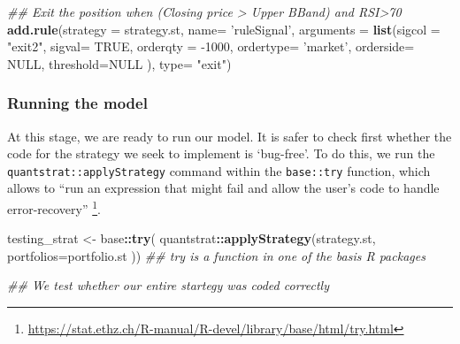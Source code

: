 \documentclass[
  11pt,
]{article}
\newenvironment{Shaded}{\begin{snugshade}}{\end{snugshade}}
\newcommand{\CommentTok}[1]{\textcolor[rgb]{0.56,0.35,0.01}{\textit{#1}}}
\newcommand{\DataTypeTok}[1]{\textcolor[rgb]{0.13,0.29,0.53}{#1}}
\newcommand{\DecValTok}[1]{\textcolor[rgb]{0.00,0.00,0.81}{#1}}
\newcommand{\KeywordTok}[1]{\textcolor[rgb]{0.13,0.29,0.53}{\textbf{#1}}}
\newcommand{\NormalTok}[1]{#1}
\newcommand{\OperatorTok}[1]{\textcolor[rgb]{0.81,0.36,0.00}{\textbf{#1}}}
\newcommand{\OtherTok}[1]{\textcolor[rgb]{0.56,0.35,0.01}{#1}}
\newcommand{\StringTok}[1]{\textcolor[rgb]{0.31,0.60,0.02}{#1}}
\begin{document}
\begin{Shaded}
\begin{Highlighting}[]
\CommentTok{## Exit the position when (Closing price > Upper BBand) and RSI>70  }
\KeywordTok{add.rule}\NormalTok{(}\DataTypeTok{strategy =}\NormalTok{ strategy.st, }\DataTypeTok{name=} \StringTok{'ruleSignal'}\NormalTok{,}
         \DataTypeTok{arguments =} \KeywordTok{list}\NormalTok{(}\DataTypeTok{sigcol =} \StringTok{"exit2"}\NormalTok{, }\DataTypeTok{sigval=} \OtherTok{TRUE}\NormalTok{,}
                          \DataTypeTok{orderqty =} \DecValTok{-1000}\NormalTok{, }\DataTypeTok{ordertype=} \StringTok{'market'}\NormalTok{, }\DataTypeTok{orderside=} \OtherTok{NULL}\NormalTok{,}
                          \DataTypeTok{threshold=}\OtherTok{NULL}\NormalTok{ ),  }
         \DataTypeTok{type=} \StringTok{"exit"}\NormalTok{)}
\end{Highlighting}
\end{Shaded}

\hypertarget{running-the-model}{%
\subsubsection{Running the model}\label{running-the-model}}

At this stage, we are ready to run our model. It is safer to check first
whether the code for the strategy we seek to implement is `bug-free'. To
do this, we run the \texttt{quantstrat::applyStrategy} command within
the \texttt{base::try} function, which allows to ``run an expression
that might fail and allow the user's code to handle error-recovery''
\footnote{\url{https://stat.ethz.ch/R-manual/R-devel/library/base/html/try.html}}.

\begin{Shaded}
\begin{Highlighting}[]
\NormalTok{testing_strat <-}\StringTok{ }\NormalTok{base}\OperatorTok{::}\KeywordTok{try}\NormalTok{( quantstrat}\OperatorTok{::}\KeywordTok{applyStrategy}\NormalTok{(strategy.st,}
                        \DataTypeTok{portfolios=}\NormalTok{portfolio.st ))}
\CommentTok{## try is a function in one of the basis R packages}

\CommentTok{## We test whether our entire startegy was coded correctly }
\end{Highlighting}
\end{Shaded}
\end{document}
